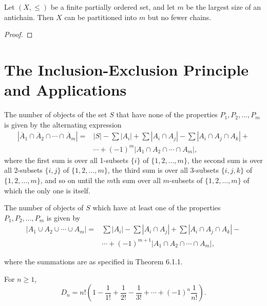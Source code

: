 \begin{theorem}
    \label{thm:5.6.2}
Let \((X, \leq)\) be a finite partially ordered set, and let \(m\) be the largest size of an antichain. Then \(X\) can be partitioned into \(m\) but no fewer chains.
\end{theorem}
\begin{proof} 
\end{proof}


\chapter{The Inclusion-Exclusion Principle and Applications}

\begin{theorem}
    \label{thm:6.1.1}
The number of objects of the set $S$ that have none of the properties $P_1, P_2, \ldots, P_m$ is given by the alternating expression
\begin{align*}
    |\overline{A}_1 \cap \overline{A}_2 \cap \cdots \cap \overline{A}_m| 
    = & |S| - \sum |A_i| + \sum |A_i \cap A_j| - \sum |A_i \cap A_j \cap A_k| + \\ 
    & \cdots + (-1)^m |A_1 \cap A_2 \cap \cdots \cap A_m|, \tag{6.2}
\end{align*}
where the first sum is over all 1-subsets $\{i\}$ of $\{1,2,\ldots,m\}$, the second sum is over all 2-subsets $\{i,j\}$ of $\{1,2,\ldots,m\}$, the third sum is over all 3-subsets $\{i,j,k\}$ of $\{1,2,\ldots,m\}$, and so on until the $m$th sum over all $m$-subsets of $\{1,2,\ldots,m\}$ of which the only one is itself.
\end{theorem} 


\begin{corollary}
    \label{cor:6.1.2}
The number of objects of $S$ which have at least one of the properties $P_1, P_2, \ldots, P_m$ is given by
\begin{align*}
    |A_1 \cup A_2 \cup \cdots \cup A_m| 
    = & \sum |A_i| - \sum |A_i \cap A_j| + \sum |A_i \cap A_j \cap A_k| - \\
    & \cdots + (-1)^{m+1} |A_1 \cap A_2 \cap \cdots \cap A_m|,
\tag{6.3}
\end{align*}

where the summations are as specified in Theorem 6.1.1.
\end{corollary}

\begin{theorem}
    \label{thm:6.3.1}
For $n \geq 1$,
\[
D_n = n! \left( 1 - \frac{1}{1!} + \frac{1}{2!} - \frac{1}{3!} + \cdots + (-1)^n \frac{1}{n!} \right).
\]
\end{theorem}

